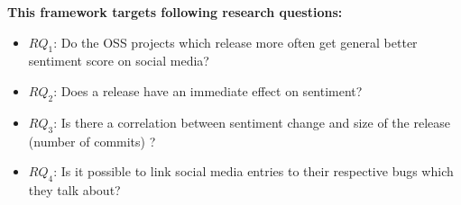 \newpage
\textbf{This framework targets following research questions:}
\begin{itemize}
\item{\textbf{$RQ_{1}$}: Do the OSS projects which release more often get general better sentiment score on social media?}
\item{\textbf{$RQ_{2}$}: Does a release have an immediate effect on sentiment?}
\item{\textbf{$RQ_{3}$}: Is there a correlation between sentiment change and size of the release (number of commits) ?}
\item{\textbf{$RQ_{4}$}: Is it possible to link social media entries to their respective bugs which they talk about?}
\end{itemize}